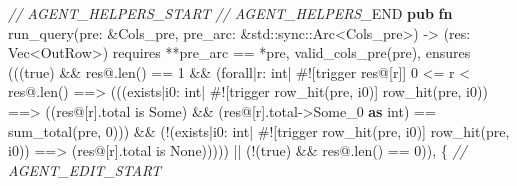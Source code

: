 \documentclass[
]{article}
\newenvironment{Shaded}{}{}
\newcommand{\AttributeTok}[1]{\textcolor[rgb]{0.49,0.56,0.16}{#1}}
\newcommand{\CommentTok}[1]{\textcolor[rgb]{0.38,0.63,0.69}{\textit{#1}}}
\newcommand{\ConstantTok}[1]{\textcolor[rgb]{0.53,0.00,0.00}{#1}}
\newcommand{\DataTypeTok}[1]{\textcolor[rgb]{0.56,0.13,0.00}{#1}}
\newcommand{\DecValTok}[1]{\textcolor[rgb]{0.25,0.63,0.44}{#1}}
\newcommand{\KeywordTok}[1]{\textcolor[rgb]{0.00,0.44,0.13}{\textbf{#1}}}
\newcommand{\NormalTok}[1]{#1}
\newcommand{\OperatorTok}[1]{\textcolor[rgb]{0.40,0.40,0.40}{#1}}
\newcommand{\PreprocessorTok}[1]{\textcolor[rgb]{0.74,0.48,0.00}{#1}}
\newcommand{\RegionMarkerTok}[1]{#1}
\begin{document}
\begin{Shaded}
\begin{Highlighting}[]
\CommentTok{// AGENT\_HELPERS\_START}
\CommentTok{// AGENT\_HELPERS\_}\RegionMarkerTok{END}
\KeywordTok{pub} \KeywordTok{fn}\NormalTok{ run\_query(pre}\OperatorTok{:} \OperatorTok{\&}\NormalTok{Cols\_pre}\OperatorTok{,}\NormalTok{ pre\_arc}\OperatorTok{:} \OperatorTok{\&}\PreprocessorTok{std::sync::}\NormalTok{Arc}\OperatorTok{\textless{}}\NormalTok{Cols\_pre}\OperatorTok{\textgreater{}}\NormalTok{) }\OperatorTok{{-}\textgreater{}}\NormalTok{ (res}\OperatorTok{:} \DataTypeTok{Vec}\OperatorTok{\textless{}}\NormalTok{OutRow}\OperatorTok{\textgreater{}}\NormalTok{)}
\NormalTok{    requires}
        \OperatorTok{**}\NormalTok{pre\_arc }\OperatorTok{==} \OperatorTok{*}\NormalTok{pre}\OperatorTok{,}
\NormalTok{        valid\_cols\_pre(pre)}\OperatorTok{,}
\NormalTok{    ensures}
\NormalTok{        (((}\ConstantTok{true}\NormalTok{) }\OperatorTok{\&\&}\NormalTok{ res}\OperatorTok{@.}\NormalTok{len() }\OperatorTok{==} \DecValTok{1} \OperatorTok{\&\&}\NormalTok{ (forall}\OperatorTok{|}\NormalTok{r}\OperatorTok{:}\NormalTok{ int}\OperatorTok{|} \AttributeTok{\#![}\NormalTok{trigger res}\OperatorTok{@}\NormalTok{[r}\AttributeTok{]}\NormalTok{] }\DecValTok{0} \OperatorTok{\textless{}=}\NormalTok{ r }\OperatorTok{\textless{}}\NormalTok{ res}\OperatorTok{@.}\NormalTok{len() }\OperatorTok{==\textgreater{}}\NormalTok{ (((exists}\OperatorTok{|}\NormalTok{i0}\OperatorTok{:}\NormalTok{ int}\OperatorTok{|} \AttributeTok{\#![}\NormalTok{trigger row\_hit}\AttributeTok{(}\NormalTok{pre}\OperatorTok{,}\NormalTok{ i0}\AttributeTok{)]}\NormalTok{ row\_hit(pre}\OperatorTok{,}\NormalTok{ i0)) }\OperatorTok{==\textgreater{}}\NormalTok{ ((res}\OperatorTok{@}\NormalTok{[r]}\OperatorTok{.}\NormalTok{total is }\ConstantTok{Some}\NormalTok{) }\OperatorTok{\&\&}\NormalTok{ (res}\OperatorTok{@}\NormalTok{[r]}\OperatorTok{.}\NormalTok{total}\OperatorTok{{-}\textgreater{}}\NormalTok{Some\_0 }\KeywordTok{as}\NormalTok{ int) }\OperatorTok{==}\NormalTok{ sum\_total(pre}\OperatorTok{,} \DecValTok{0}\NormalTok{))) }\OperatorTok{\&\&}\NormalTok{ (}\OperatorTok{!}\NormalTok{(exists}\OperatorTok{|}\NormalTok{i0}\OperatorTok{:}\NormalTok{ int}\OperatorTok{|} \AttributeTok{\#![}\NormalTok{trigger row\_hit}\AttributeTok{(}\NormalTok{pre}\OperatorTok{,}\NormalTok{ i0}\AttributeTok{)]}\NormalTok{ row\_hit(pre}\OperatorTok{,}\NormalTok{ i0)) }\OperatorTok{==\textgreater{}}\NormalTok{ (res}\OperatorTok{@}\NormalTok{[r]}\OperatorTok{.}\NormalTok{total is }\ConstantTok{None}\NormalTok{))))) }\OperatorTok{||}\NormalTok{ (}\OperatorTok{!}\NormalTok{(}\ConstantTok{true}\NormalTok{) }\OperatorTok{\&\&}\NormalTok{ res}\OperatorTok{@.}\NormalTok{len() }\OperatorTok{==} \DecValTok{0}\NormalTok{))}\OperatorTok{,}
\OperatorTok{\{}
\CommentTok{// AGENT\_EDIT\_START}
\end{Highlighting}
\end{Shaded}
\end{document}
